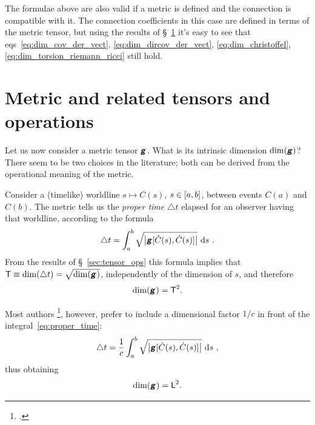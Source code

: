 \documentclass[\ifafour a4paper,12pt,\else a5paper,10pt,\fi%
onecolumn,oneside,article,%
british%
]{memoir}
\makeatletter
\theoremstyle{remark}
\theoremstyle{innote}
\newcommand*{\mathte}[1]{\textbf{\textit{\textsf{#1}}}}
\newcommand*{\citep}{\footcites}
\newcommand*{\di}{\mathrm{d}}%
\newcommand*{\incr}{\triangle}%
\DeclarePairedDelimiter\clcl{[}{]}
\DeclarePairedDelimiter\abs{\lvert}{\rvert}
\renewcommand*{\|}[1][]{\nonscript\,#1\vert\nonscript\;\mathopen{}}
\newcommand*{\sect}{\S}%
\newcommand*{\chap}{ch.}%
\newcommand*{\eqn}{eq.}%
\newcommand*{\eqns}{eqs}%
\newcommand*{\eg}{{e.g.}}
\newcommand*{\q}{}%
\DeclareRobustCommand*{\q}{%
  \mathbin{\mathpalette\bigcdot@{}}%
}
\newcommand*{\bigcdot@scalefactor}{0.7}
\newcommand*{\bigcdot@widthfactor}{1.5}
\newcommand*{\bigcdot@}[2]{%
  \sbox0{$#1\vcenter{}$}%
  \sbox2{$#1\cdot\m@th$}%
  \hbox to \bigcdot@widthfactor\wd2{%
    \hfil
    \raise\ht0\hbox{%
      \scalebox{\bigcdot@scalefactor}{%
        \lower\ht0\hbox{$#1\bullet\m@th$}%
      }%
    }%
    \hfil
  }%
}
\newcommand*{\Le}{\textsf{L}}
\newcommand*{\Ti}{\textsf{T}}
\newcommand*{\yg}{\mathte{g}}
\newcommand*{\ygc}{\mathte{g}}
\renewcommand*{\i}{\indices}
\newcommand*{\inct}{\incr t}
\makeatother
\begin{document}
\medskip

The formulae above are also valid if a metric is defined and the connection
is compatible with it. The connection coefficients in this case are defined
in terms of the metric tensor, but using the results of
\sect~\ref{sec:metric} it's easy to see that
\eqns~\eqref{eq:dim_cov_der_vect}, \eqref{eq:dim_dircov_der_vect},
\eqref{eq:dim_christoffel}, \eqref{eq:dim_torsion_riemann_ricci} still
hold.


\section{Metric and related tensors and operations}
\label{sec:metric}

Let us now consider a metric tensor $\yg\i{_{\q\q}}$. What is its intrinsic
dimension $\dim(\yg)$? There seem to be two choices in the literature; both
can be derived from the operational meaning of the metric.


Consider a (timelike) worldline $s \mapsto C(s)$, $s\in \clcl{a,b}$,
between events $C(a)$ and $C(b)$. The metric tells us the \emph{proper
  time} $\inct$ elapsed for an observer having that worldline, according to
the formula
\begin{equation}%
  \label{eq:proper_time}
\inct =  \int_a^b
\sqrt{\abs*{\yg[\dot{C}(s),\dot{C}(s)]}} \  \di s\ .
\end{equation}
From the results of \sect~\ref{sec:tensor_ops} this formula implies that
 $\Ti \equiv \dim(\inct) = \sqrt{\dim(\yg\i{_{\q\q}})}$,
independently of the dimension of $s$, and therefore
\begin{equation}%
  \label{eq:dim_g}
  \dim(\yg\i{_{\q\q}}) = \Ti^{2}.
\end{equation}

Most authors \citep[\eg][\sect~V.62 \eqn~(62.02)]{fock1955_t1964}[\chap~11
\eqn~(11.21)]{curtisetal1985}[\sect~5.3
\eqn~(5.6)]{rindler1969_r1986}[\chap~6 \eqn~(6.24)]{hartle2003}, however,
prefer to include a dimensional factor $1/c$ in front of the
integral~\eqref{eq:proper_time}:
\begin{equation}%
  \label{eq:proper_time_c}
  \inct = \frac{1}{c} \int_a^b
  \sqrt{\abs*{\ygc[\dot{C}(s),\dot{C}(s)]}} \ \di s\ ,
\end{equation}
thus obtaining
\begin{equation}%
  \label{eq:dim_g_c}
  \dim(\ygc\i{_{\q\q}}) = \Le^{2}.
\end{equation}
\end{document}
